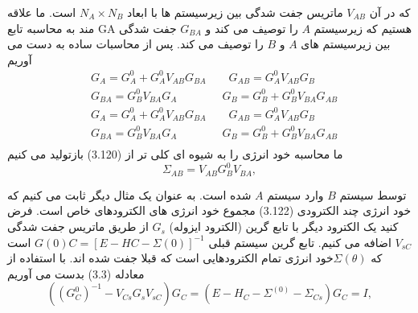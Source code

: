 که در آن $V_{AB}$ ماتریس جفت شدگی بین زیرسیستم ها با ابعاد $N_A\times N_B$ است. ما علاقه مند به محاسبه تابع GA هستیم که زیرسیستم $A$ را توصیف می کند و $G_{BA}$ جفت شدگی بین زیرسیستم های $A$ و $B$ را توصیف می کند. پس از محاسبات ساده به دست می آوریم
\begin{equation}
    \begin{split}
          & {{G}_{A}}=G_{A}^{0}+G_{A}^{0}{{V}_{AB}}{{G}_{BA}}\qquad {{G}_{AB}}=G_{A}^{0}{{V}_{AB}}{{G}_{B}} \\ 
         & {{G}_{BA}}=G_{B}^{0}{{V}_{BA}}{{G}_{A}}\qquad \qquad {{G}_{B}}=G_{B}^{0}+G_{B}^{0}{{V}_{BA}}{{G}_{AB}} \\ 
         & {{G}_{A}}=G_{A}^{0}+G_{A}^{0}{{V}_{AB}}{{G}_{BA}}\qquad {{G}_{AB}}=G_{A}^{0}{{V}_{AB}}{{G}_{B}} \\ 
        & {{G}_{BA}}=G_{B}^{0}{{V}_{BA}}{{G}_{A}}\qquad \qquad {{G}_{B}}=G_{B}^{0}+G_{B}^{0}{{V}_{BA}}{{G}_{AB}} \\ 
    \end{split}
\end{equation}
ما محاسبه خود انرژی را به شیوه ای کلی تر از (3.120) بازتولید می کنیم 
\begin{equation}
    {{\Sigma }_{AB}}={{V}_{AB}}G_{B}^{0}{{V}_{BA}},
\end{equation}

توسط سیستم $B$ وارد سیستم $A$ شده است.
به عنوان یک مثال دیگر ثابت می کنیم که خود انرژی چند الکترودی (3.122) مجموع خود انرژی های الکترودهای خاص است. فرض کنید یک الکترود دیگر با تابع گرین (الکترود ایزوله) $G_s$ از طریق ماتریس جفت شدگی $V_{sC}$ اضافه می کنیم. تابع گرین سیستم قبلی $G(0)C= [E−HC−Σ(0)]^{-1}$ است که $\Sigma(\theta)$خود انرژی تمام الکترودهایی است که قبلا جفت شده اند. با استفاده از معادله (3.3) بدست می آوریم
\begin{equation}
    \left( {{\left( G_{C}^{0} \right)}^{-1}}-{{V}_{Cs}}{{G}_{s}}{{V}_{sC}} \right){{G}_{C}}=\left( E-{{H}_{C}}-{{\Sigma }^{(0)}}-{{\Sigma }_{Cs}} \right){{G}_{C}}=I,
\end{equation}

